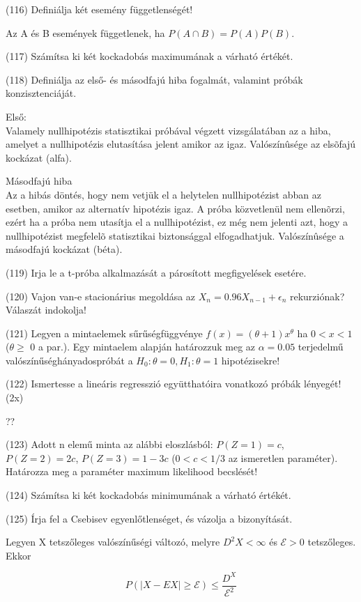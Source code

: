 \documentclass[12p]{article}
\begin{document}
(116) Definiálja két esemény függetlenségét!

Az A és B események függetlenek, ha $P(A \cap B) = P(A)P(B)$.

(117) Számítsa ki két kockadobás maximumának a várható értékét.

(118) Definiálja az első- és másodfajú hiba fogalmát, valamint próbák konzisztenciáját.

Első:\\
Valamely nullhipotézis statisztikai próbával végzett vizsgálatában az a hiba, amelyet a nullhipotézis elutasítása jelent amikor az igaz. Valószínûsége az elsõfajú kockázat (alfa). 

Másodfajú hiba\\
Az a hibás döntés, hogy nem vetjük el a helytelen nullhipotézist abban az esetben, amikor az alternatív hipotézis igaz. A próba közvetlenül nem ellenõrzi, ezért ha a próba nem utasítja el a nullhipotézist, ez még nem jelenti azt, hogy a nullhipotézist megfelelõ statisztikai biztonsággal elfogadhatjuk. Valószínûsége a másodfajú kockázat (béta). 



(119) Irja le a t-próba alkalmazását a párosított megfigyelések esetére.

(120) Vajon van-e stacionárius megoldása az $X_n = 0.96 X_{n-1} + \epsilon_n$ rekurziónak? Válaszát
indokolja!

(121) Legyen a mintaelemek sűrűségfüggvénye $f(x) = (\theta + 1)x^{\theta}$ ha $0 < x < 1$ ($\theta \geq$ 0 a par.).
Egy mintaelem alapján határozzuk meg az $\alpha = 0.05$ terjedelmű valószínűséghányadospróbát a $H_0 : \theta = 0, H_1 : \theta = 1$ hipotézisekre!

(122) Ismertesse a lineáris regresszió együtthatóira vonatkozó próbák lényegét! (2x)

??

(123) Adott n elemű minta az alábbi eloszlásból: $P(Z = 1) = c$, $P(Z = 2) = 2c$, $P(Z = 3) = 1 - 3c$ ($0 < c < 1/3$ az ismeretlen paraméter). Határozza meg a paraméter maximum likelihood becslését!

(124) Számítsa ki két kockadobás minimumának a várható értékét.

(125) Írja fel a Csebisev egyenlőtlenséget, és vázolja a bizonyítását.

Legyen X tetszőleges valószínűségi változó, melyre $D^2X < \infty$ és $\mathcal{E} > 0$ tetszőleges. Ekkor

$$P(|X - EX| \geq \mathcal{E}) \leq \frac{D^X}{\mathcal{E}^2}$$
\end{document}
